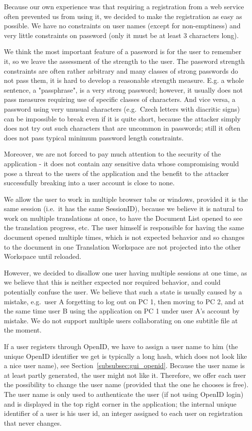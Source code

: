 Because our own experience was that requiring a registration from a web service often prevented us from using it, we decided to make the registration as easy as possible. We have no constraints on user names (except for non-emptiness) and very little constraints on password (only it must be at least 3 characters long).

We think the most important feature of a password is for the user to remember it, so we leave the assessment of the strength to the user. The password strength constraints are often rather arbitrary and many classes of strong passwords do not pass them, it is hard to develop a reasonable strength measure. E.g. a whole sentence, a "passphrase", is a very strong password; however, it usually does not pass measures requiring use of specific classes of characters. And vice versa, a password using very unusual characters (e.g.\ Czech letters with diacritic signs) can be impossible to break even if it is quite short, because the attacker simply does not try out such characters that are uncommon in passwords; still it often does not pass typical minimum password length constraints.

Moreover, we are not forced to pay much attention to the security of the application - it does not contain any sensitive data whose compromising would pose a threat to the users of the application and the benefit to the attacker successfully breaking into a user account is close to none.

We allow the user to work in multiple browser tabs or windows, provided it is the same session (i.e.\ it has the same SessionID), because we believe it is natural to work on multiple translations at once, to have the Document List opened to see the translation progress, etc. The user himself is responsible for having the same document opened multiple times, which is not expected behavior and so changes to the document in one Translation Workspace are not projected into the other Workspace until reloaded.

However, we decided to disallow one user having multiple sessions at one time, as we believe that this is neither expected nor required behavior, and could potentially confuse the user. We believe that such a state is usually caused by a mistake, e.g.\ user A forgetting to log out on PC 1, then moving to PC 2, and at the same time user B using the application on PC 1 under user A's account by mistake.
We do not support multiple users collaborating on one subtitle file at the moment.

If a user registers through OpenID, we have to assign a user name to him (the unique OpenID identifier we get is typically a long hash, which does not look like a nice user name), see Section~\ref{subsubsec:gui_openid}. Because the user name is at least partly generated, the user might not like it. Therefore, we offer each user the possibility to change the user name (provided that the one he chooses is free). The user name is only used to authenticate the user (if not using OpenID login) and is displayed in the top right corner in the application; the internal unique identifier of a user is his user id, an integer assigned to each user on registration that never changes.

